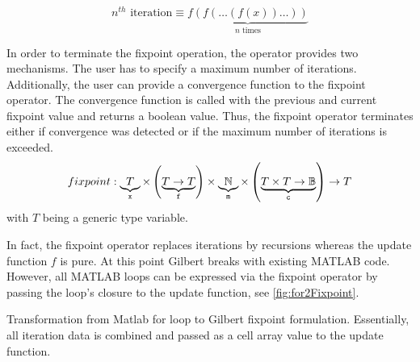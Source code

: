 \begin{displaymath}
  n^{th}\text{ iteration}\equiv\underbrace{f(f(\ldots(f(x))\ldots))}_{\text{$n$ times}}
\end{displaymath}

In order to terminate the fixpoint operation, the operator provides two mechanisms.
The user has to specify a maximum number  of iterations.
Additionally, the user can provide a convergence function  to the fixpoint operator.
The convergence function is called with the previous and current fixpoint value and returns a boolean value.
Thus, the fixpoint operator terminates either if convergence was detected or if the maximum number of iterations is exceeded.
\begin{equation}
fixpoint: \underbrace{T}_{\text{\texttt{x}}} \times \left( \underbrace{T \rightarrow T}_{\text{\texttt{f}}} \right) \times \underbrace{\mathbb{N}}_{\text{\texttt{m}}} \times \left(\underbrace{T\times T \rightarrow \mathbb{B}}_{\text{\texttt{c}}} \right) \rightarrow T
\label{eqn:fixpoint}
\end{equation}
with $T$ being a generic type variable.

In fact, the fixpoint operator replaces iterations by recursions whereas the update function $f$ is pure. At this point Gilbert breaks with existing MATLAB code. However, all MATLAB loops can be expressed via the fixpoint operator by passing the loop's closure to the update function, see \cref{fig:for2Fixpoint}.

\begin{listing}
  \centering
  \caption{Transformation from Matlab for loop  to Gilbert fixpoint  formulation. Essentially, all iteration data is combined and passed as a cell array value to the update function.}
  \label{fig:for2Fixpoint}
\end{listing}

